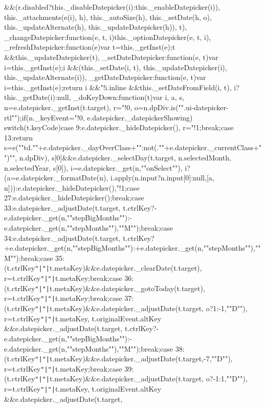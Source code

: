 \&\&(r.\+disabled?this.\+\_\+disable\+Datepicker(i)\+:this.\+\_\+enable\+Datepicker(i)), this.\+\_\+attachments(e(i), h), this.\+\_\+auto\+Size(h), this.\+\_\+set\+Date(h, o), this.\+\_\+update\+Alternate(h), this.\+\_\+update\+Datepicker(h)), t)\rcurly{}, \+\_\+change\+Datepicker\+:function(e, t, i)\lcurly{}this.\+\_\+option\+Datepicker(e, t, i)\rcurly{}, \+\_\+refresh\+Datepicker\+:function(e)\lcurly{}var t=this.\+\_\+get\+Inst(e);t \&\&this.\+\_\+update\+Datepicker(t)\rcurly{}, \+\_\+set\+Date\+Datepicker\+:function(e, t)\lcurly{}var i=this.\+\_\+get\+Inst(e);i \&\&(this.\+\_\+set\+Date(i, t), this.\+\_\+update\+Datepicker(i), this.\+\_\+update\+Alternate(i))\rcurly{}, \+\_\+get\+Date\+Datepicker\+:function(e, t)\lcurly{}var i=this.\+\_\+get\+Inst(e);return i \&\&"!i.\+inline \&\&this.\+\_\+set\+Date\+From\+Field(i, t), i?this.\+\_\+get\+Date(i)\+:null\rcurly{}, \+\_\+do\+Key\+Down\+:function(t)\lcurly{}var i, a, s, n=e.\+datepicker.\+\_\+get\+Inst(t.\+target), r="!0, o=n.\+dp\+Div.\+is("".\+ui-\/datepicker-\/rtl"");if(n.\+\_\+key\+Event="!0, e.\+datepicker.\+\_\+datepicker\+Showing) switch(t.\+key\+Code)\lcurly{}case 9\+:e.\+datepicker.\+\_\+hide\+Datepicker(), r="!1;break;case 13\+:return s=e(""td.""+e.\+datepicker.\+\_\+day\+Over\+Class+""\+:not(.""+e.\+datepicker.\+\_\+current\+Class+"")"", n.\+dp\+Div), s[0]\&\&e.\+datepicker.\+\_\+select\+Day(t.\+target, n.\+selected\+Month, n.\+selected\+Year, s[0]), i=e.\+datepicker.\+\_\+get(n,""on\+Select""), i?(a=e.\+datepicker.\+\_\+format\+Date(n), i.\+apply(n.\+input?n.\+input[0]\+:null,[a, n]))\+:e.\+datepicker.\+\_\+hide\+Datepicker(),"!1;case 27\+:e.\+datepicker.\+\_\+hide\+Datepicker();break;case 33\+:e.\+datepicker.\+\_\+adjust\+Date(t.\+target, t.\+ctrl\+Key?-\/e.\+datepicker.\+\_\+get(n,""step\+Big\+Months"")\+:-\/e.\+datepicker.\+\_\+get(n,""step\+Months""),""M"");break;case 34\+:e.\+datepicker.\+\_\+adjust\+Date(t.\+target, t.\+ctrl\+Key?+e.\+datepicker.\+\_\+get(n,""step\+Big\+Months"")\+:+e.\+datepicker.\+\_\+get(n,""step\+Months""),""M"");break;case 35\+:(t.\+ctrl\+Key\texttt{"|}\texttt{"|}t.\+meta\+Key)\&\&e.\+datepicker.\+\_\+clear\+Date(t.\+target), r=t.\+ctrl\+Key\texttt{"|}\texttt{"|}t.\+meta\+Key;break;case 36\+:(t.\+ctrl\+Key\texttt{"|}\texttt{"|}t.\+meta\+Key)\&\&e.\+datepicker.\+\_\+goto\+Today(t.\+target), r=t.\+ctrl\+Key\texttt{"|}\texttt{"|}t.\+meta\+Key;break;case 37\+:(t.\+ctrl\+Key\texttt{"|}\texttt{"|}t.\+meta\+Key)\&\&e.\+datepicker.\+\_\+adjust\+Date(t.\+target, o?1\+:-\/1,""D""), r=t.\+ctrl\+Key\texttt{"|}\texttt{"|}t.\+meta\+Key, t.\+original\+Event.\+alt\+Key \&\&e.\+datepicker.\+\_\+adjust\+Date(t.\+target, t.\+ctrl\+Key?-\/e.\+datepicker.\+\_\+get(n,""step\+Big\+Months"")\+:-\/e.\+datepicker.\+\_\+get(n,""step\+Months""),""M"");break;case 38\+:(t.\+ctrl\+Key\texttt{"|}\texttt{"|}t.\+meta\+Key)\&\&e.\+datepicker.\+\_\+adjust\+Date(t.\+target,-\/7,""D""), r=t.\+ctrl\+Key\texttt{"|}\texttt{"|}t.\+meta\+Key;break;case 39\+:(t.\+ctrl\+Key\texttt{"|}\texttt{"|}t.\+meta\+Key)\&\&e.\+datepicker.\+\_\+adjust\+Date(t.\+target, o?-\/1\+:1,""D""), r=t.\+ctrl\+Key\texttt{"|}\texttt{"|}t.\+meta\+Key, t.\+original\+Event.\+alt\+Key \&\&e.\+datepicker.\+\_\+adjust\+Date(t.\+target, 
